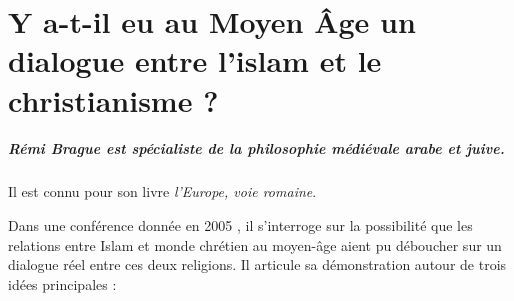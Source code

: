 \chapter{Y a-t-il eu au Moyen Âge un dialogue entre l’islam et le christianisme ?}

\begin{comment}

\paragraph{Instruction} 5000 signes, très synthétique. Fiche de lecture, idées principales du texte (plan haché : donc on peut rassembler les idées qui vient d'une conférence). Qui est Rémi Brague ? Quelle publication ? Arriver à la fois à faire des liens avec une séance de théologie ou d'histoire ?  En particulier lire Convivencia. Texte d'un chrétien. Deuxième partie est libre et on se permet sur 1/3 des signes, comment on a lu le texte "pas assez approfondi",... Se relire et éviter les fautes. 


Cette fiche de lecture, entre 4000 et 5000 caractères (espace compris), devra :  

- présenter brièvement  l'auteur de l'article

- mettre en évidence les idées fortes du texte dans un contexte d'intérêt croissant des chercheurs pour les relations entre musulmans et non-musulmans (cf. gros programme de recherche dirigé par John Tolan évoqué aujourd'hui)

- Votre conclusion, dense, vous permettra de faire un commentaire personnel sur les apports et limites de l'article, en le situant par rapport à la réflexion plus large que nous menons en cours et que vous entreprenez, de votre côté, par vos lectures personnelles
\end{comment}



\paragraph{Rémi Brague est spécialiste de la philosophie médiévale arabe et juive.} Il  est connu pour son livre  \textit{l'Europe, voie romaine}\cite{brague_europe_2009}. 

 
Dans une conférence donnée en 2005 \cite{lejbowicz_y_2005}, il s'interroge sur la possibilité que les relations entre Islam et monde chrétien au moyen-âge aient pu déboucher sur un dialogue réel entre ces deux religions. 
Il articule sa démonstration autour de trois idées principales : \begin{comment}
    : l'asymétrie entre monde Islamique et monde Chrétien, l'absence de tolérance religieuse au Moyen-âge, et le caractère largement polémique des \textit{dialogues} entre religions
\end{comment}



